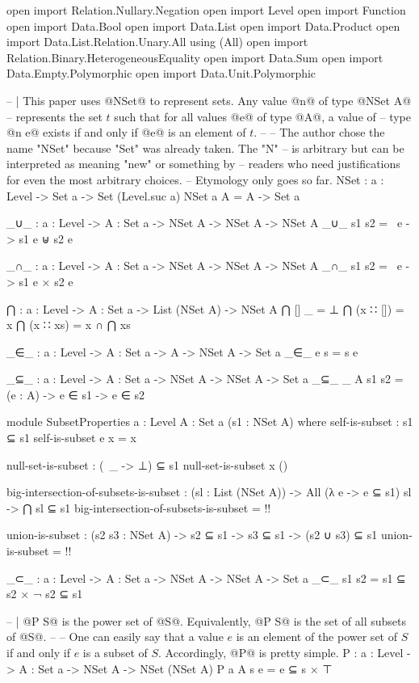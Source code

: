 \begin{code}
open import Relation.Nullary.Negation
open import Level
open import Function
open import Data.Bool
open import Data.List
open import Data.Product
open import Data.List.Relation.Unary.All using (All)
open import Relation.Binary.HeterogeneousEquality
open import Data.Sum
open import Data.Empty.Polymorphic
open import Data.Unit.Polymorphic

-- | This paper uses @NSet@ to represent sets.  Any value @n@ of type @NSet A@
-- represents the set \(t\) such that for all values @e@ of type @A@, a value of
-- type @n e@ exists if and only if @e@ is an element of \(t\).
--
-- The author chose the name "NSet" because "Set" was already taken.  The "N"
-- is arbitrary but can be interpreted as meaning "new" or something by
-- readers who need justifications for even the most arbitrary choices.
-- Etymology only goes so far.
NSet : {a : Level} -> Set a -> Set (Level.suc a)
NSet {a} A = A -> Set a

_∪_ : {a : Level} -> {A : Set a} -> NSet A -> NSet A -> NSet A
_∪_ s1 s2 = \ e -> s1 e ⊎ s2 e

_∩_ : {a : Level} -> {A : Set a} -> NSet A -> NSet A -> NSet A
_∩_ s1 s2 = \ e -> s1 e × s2 e

⋂ : {a : Level} -> {A : Set a} -> List (NSet A) -> NSet A
⋂ [] _ = ⊥
⋂ (x ∷ []) = x
⋂ (x ∷ xs) = x ∩ ⋂ xs

_∈_ : {a : Level} -> {A : Set a} -> A -> NSet A -> Set a
_∈_ e s = s e

_⊆_ : {a : Level} -> {A : Set a} -> NSet A -> NSet A -> Set a
_⊆_ {_} {A} s1 s2 = (e : A) -> e ∈ s1 -> e ∈ s2

module SubsetProperties {a : Level} {A : Set a} (s1 : NSet A) where
  self-is-subset : s1 ⊆ s1
  self-is-subset e x = x

  null-set-is-subset : (\ _ -> ⊥) ⊆ s1
  null-set-is-subset x ()

  big-intersection-of-subsets-is-subset :
    (sl : List (NSet A)) ->
    All (λ e -> e ⊆ s1) sl ->
    ⋂ sl ⊆ s1
  big-intersection-of-subsets-is-subset = {!!}

  union-is-subset :
    (s2 s3 : NSet A) ->
    s2 ⊆ s1 ->
    s3 ⊆ s1 ->
    (s2 ∪ s3) ⊆ s1
  union-is-subset = {!!}

_⊂_ : {a : Level} -> {A : Set a} -> NSet A -> NSet A -> Set a
_⊂_ s1 s2 = s1 ⊆ s2 × ¬ s2 ⊆ s1

-- | @P S@ is the power set of @S@.  Equivalently, @P S@ is the set of all subsets of @S@.
--
-- One can easily say that a value \(e\) is an element of the power set of \(S\) if and only if \(e\) is a subset of \(S\).  Accordingly, @P@ is pretty simple.
P : {a : Level} -> {A : Set a} -> NSet A -> NSet (NSet A)
P {a} {A} s e = e ⊆ s × ⊤


\end{code}
